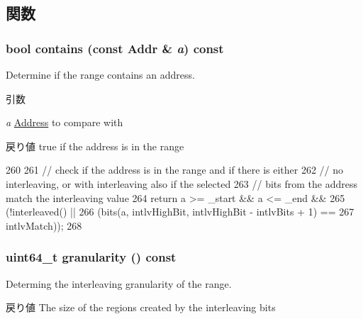 \subsection{関数}
\hypertarget{classAddrRange_aa839dbf0ffc0e871a3f08f1d23d78a18}{
\subsubsection[{contains}]{\setlength{\rightskip}{0pt plus 5cm}bool contains (const {\bf Addr} \& {\em a}) const}}
\label{classAddrRange_aa839dbf0ffc0e871a3f08f1d23d78a18}
Determine if the range contains an address.


\begin{DoxyParams}{引数}
\item[{\em a}]\hyperlink{classAddress}{Address} to compare with \end{DoxyParams}
\begin{DoxyReturn}{戻り値}
true if the address is in the range 
\end{DoxyReturn}



\begin{DoxyCode}
260     {
261         // check if the address is in the range and if there is either
262         // no interleaving, or with interleaving also if the selected
263         // bits from the address match the interleaving value
264         return a >= _start && a <= _end &&
265             (!interleaved() ||
266              (bits(a, intlvHighBit, intlvHighBit - intlvBits + 1) ==
267               intlvMatch));
268     }
\end{DoxyCode}
\hypertarget{classAddrRange_a2eca79b1c6faa6be9254f65e6e886355}{
\subsubsection[{granularity}]{\setlength{\rightskip}{0pt plus 5cm}uint64\_\-t granularity () const}}
\label{classAddrRange_a2eca79b1c6faa6be9254f65e6e886355}
Determing the interleaving granularity of the range.

\begin{DoxyReturn}{戻り値}
The size of the regions created by the interleaving bits 
\end{DoxyReturn}



